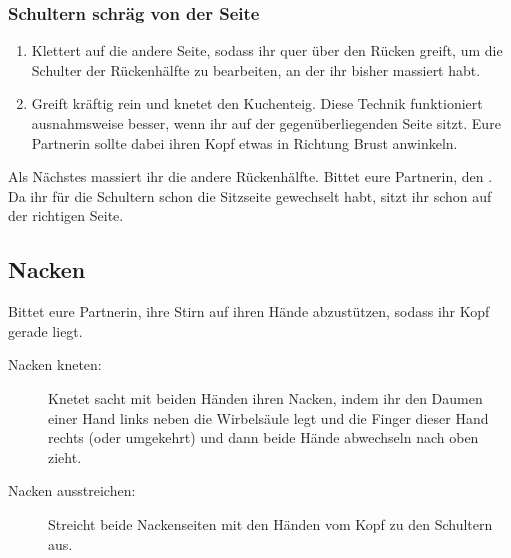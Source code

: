 \subsubsection{Schultern schräg von der Seite}

\begin{oframed}
  \begin{enumerate}
    \iftoggle{long}{
      \item \fett{Milchtritt/Tigerkrallen:} Krallt die Muskeln um die Schulterblätter.
      \item \fett{Zwischen Schulterblatt und Rippen:} Hebt das Schulterblatt und den Ellenbogen eurer Partnerin an und stützt diese mit einem Arm (und bei Bedarf mit eurem Knie). Massiert dann mit der Fingerspitzen mit viel Druck unter dem Schulterblatt entlang.
    }{}
    \item {} Klettert auf die andere Seite, sodass ihr quer über den Rücken greift, um die Schulter der Rückenhälfte zu bearbeiten, an der ihr bisher massiert habt.
    \item {} Greift kräftig rein und knetet den Kuchenteig. Diese Technik funktioniert ausnahmsweise besser, wenn ihr auf der gegenüberliegenden Seite sitzt. Eure Partnerin sollte dabei ihren Kopf etwas in Richtung Brust anwinkeln.
  \end{enumerate}
\end{oframed}

Als Nächstes massiert ihr die andere Rückenhälfte. Bittet eure Partnerin, den . Da ihr für die Schultern schon die Sitzseite gewechselt habt, sitzt ihr schon auf der richtigen Seite.

\pagebreak
\subsection{Nacken}

Bittet eure Partnerin, ihre Stirn auf ihren Hände abzustützen, sodass ihr Kopf gerade liegt.

\begin{description}
  \item[Nacken kneten:] Knetet sacht mit beiden Händen ihren Nacken, indem ihr den Daumen einer Hand links neben die Wirbelsäule legt und die Finger dieser Hand rechts (oder umgekehrt) und dann beide Hände abwechseln nach oben zieht.
  \item[Nacken ausstreichen:] Streicht beide Nackenseiten mit den Händen vom Kopf zu den Schultern aus.
\end{description}

